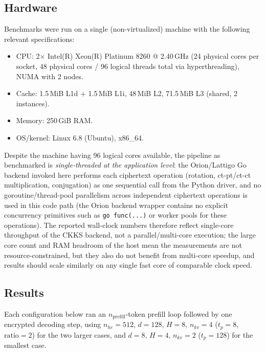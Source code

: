 \documentclass[11pt]{article}
\begin{document}
\subsection{Hardware}
Benchmarks were run on a single (non-virtualized) machine with the
following relevant specifications:
\begin{itemize}
  \item CPU: 2$\times$ Intel(R) Xeon(R) Platinum 8260 @ 2.40\,GHz
        (24 physical cores per socket, 48 physical cores / 96 logical
        threads total via hyperthreading), NUMA with 2 nodes.
  \item Cache: 1.5\,MiB L1d + 1.5\,MiB L1i, 48\,MiB L2, 71.5\,MiB L3
        (shared, 2 instances).
  \item Memory: 250\,GiB RAM.
  \item OS/kernel: Linux 6.8 (Ubuntu), x86\_64.
\end{itemize}
Despite the machine having 96 logical cores available, the pipeline as
benchmarked is \emph{single-threaded at the application level}: the
Orion/Lattigo Go backend invoked here performs each ciphertext operation
(rotation, ct-pt/ct-ct multiplication, conjugation) as one sequential
call from the Python driver, and no goroutine/thread-pool parallelism
across independent ciphertext operations is used in this code path (the
Orion backend wrapper contains no explicit concurrency primitives such
as \texttt{go func(...)} or worker pools for these operations). The
reported wall-clock numbers therefore reflect single-core throughput of
the CKKS backend, not a parallel/multi-core execution; the large core
count and RAM headroom of the host mean the measurements are not
resource-constrained, but they also do not benefit from multi-core
speedup, and results should scale similarly on any single fast core of
comparable clock speed.

\subsection{Results}
Each configuration below ran an $n_{\text{prefill}}$-token prefill loop
followed by one encrypted decoding step, using
$n_{he} = 512$, $d = 128$, $H = 8$, $n_{kv} = 4$
($t_p = 8$, $\mathrm{ratio} = 2$) for the two larger cases, and
$d = 8$, $H = 4$, $n_{kv} = 2$ ($t_p = 128$) for the smallest case.
\end{document}
